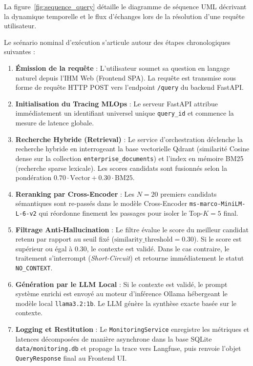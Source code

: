 La figure~\ref{fig:sequence_query} détaille le diagramme de séquence UML décrivant la dynamique temporelle et le flux d'échanges lors de la résolution d'une requête utilisateur.

Le scénario nominal d'exécution s'articule autour des étapes chronologiques suivantes :
\begin{enumerate}
    \item \textbf{Émission de la requête} : L'utilisateur soumet sa question en langage naturel depuis l'IHM Web (Frontend SPA). La requête est transmise sous forme de requête HTTP POST vers l'endpoint \texttt{/query} du backend FastAPI.
    \item \textbf{Initialisation du Tracing MLOps} : Le serveur FastAPI attribue immédiatement un identifiant universel unique \texttt{query\_id} et commence la mesure de latence globale.
    \item \textbf{Recherche Hybride (Retrieval)} : Le service d'orchestration déclenche la recherche hybride en interrogeant la base vectorielle Qdrant (similarité Cosine dense sur la collection \texttt{enterprise\_documents}) et l'index en mémoire BM25 (recherche sparse lexicale). Les scores candidats sont fusionnés selon la pondération $0.70 \cdot \text{Vector} + 0.30 \cdot \text{BM25}$.
    \item \textbf{Reranking par Cross-Encoder} : Les $N=20$ premiers candidats sémantiques sont re-passés dans le modèle Cross-Encoder \texttt{ms-marco-MiniLM-L-6-v2} qui réordonne finement les passages pour isoler le Top-$K=5$ final.
    \item \textbf{Filtrage Anti-Hallucination} : Le filtre évalue le score du meilleur candidat retenu par rapport au seuil fixé ($\text{similarity\_threshold} = 0.30$). Si le score est supérieur ou égal à $0.30$, le contexte est validé. Dans le cas contraire, le traitement s'interrompt (\textit{Short-Circuit}) et retourne immédiatement le statut \texttt{NO\_CONTEXT}.
    \item \textbf{Génération par le LLM Local} : Si le contexte est validé, le prompt système enrichi est envoyé au moteur d'inférence Ollama hébergeant le modèle local \texttt{llama3.2:1b}. Le LLM génère la synthèse exacte basée sur le contexte.
    \item \textbf{Logging et Restitution} : Le \texttt{MonitoringService} enregistre les métriques et latences décomposées de manière asynchrone dans la base SQLite \texttt{data/monitoring.db} et propage la trace vers Langfuse, puis renvoie l'objet \texttt{QueryResponse} final au Frontend UI.
\end{enumerate}

